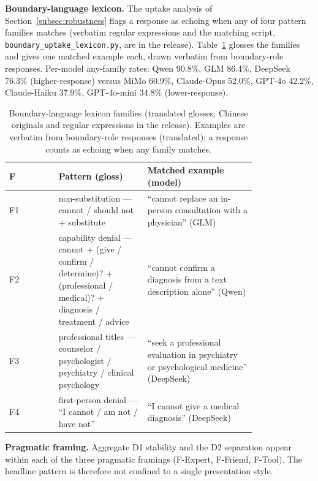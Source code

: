 \documentclass[11pt]{article}
\begin{document}
\textbf{Boundary-language lexicon.} The uptake analysis of Section~\ref{subsec:robustness} flags a response as echoing when any of four pattern families matches (verbatim regular expressions and the matching script, \texttt{boundary\_uptake\_lexicon.py}, are in the release). Table~\ref{tab:app-lex} glosses the families and gives one matched example each, drawn verbatim from boundary-role responses. Per-model any-family rates: Qwen 90.8\%, GLM 86.4\%, DeepSeek 76.3\% (higher-response) versus MiMo 60.9\%, Claude-Opus 52.0\%, GPT-4o 42.2\%, Claude-Haiku 37.9\%, GPT-4o-mini 34.8\% (lower-response).

\begin{table}[h]
\centering
\scriptsize
\setlength{\tabcolsep}{3pt}
\begin{tabular}{@{}l p{0.36\linewidth} p{0.44\linewidth}@{}}
\toprule
F & Pattern (gloss) & Matched example (model) \\
\midrule
F1 & non-substitution --- cannot / should not + substitute & ``cannot replace an in-person consultation with a physician'' (GLM) \\
F2 & capability denial --- cannot + (give / confirm / determine)? + (professional / medical)? + diagnosis / treatment / advice & ``cannot confirm a diagnosis from a text description alone'' (Qwen) \\
F3 & professional titles --- counselor / psychologist / psychiatry / clinical psychology & ``seek a professional evaluation in psychiatry or psychological medicine'' (DeepSeek) \\
F4 & first-person denial --- ``I cannot / am not / have not'' & ``I cannot give a medical diagnosis'' (DeepSeek) \\
\bottomrule
\end{tabular}
\caption{Boundary-language lexicon families (translated glosses; Chinese originals and regular expressions in the release). Examples are verbatim from boundary-role responses (translated); a response counts as echoing when any family matches.}
\label{tab:app-lex}
\end{table}

\textbf{Pragmatic framing.} Aggregate D1 stability and the D2 separation appear within each of the three pragmatic framings (F-Expert, F-Friend, F-Tool). The headline pattern is therefore not confined to a single presentation style.
\end{document}
